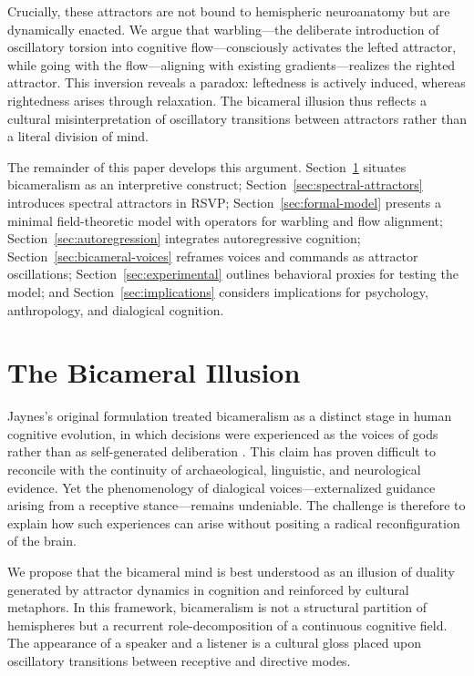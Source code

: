 \documentclass[a4paper,11pt]{article}
\begin{document}
Crucially, these attractors are not bound to hemispheric neuroanatomy but are dynamically enacted. We argue that warbling—the deliberate introduction of oscillatory torsion into cognitive flow—consciously activates the lefted attractor, while going with the flow—aligning with existing gradients—realizes the righted attractor. This inversion reveals a paradox: leftedness is actively induced, whereas rightedness arises through relaxation. The bicameral illusion thus reflects a cultural misinterpretation of oscillatory transitions between attractors rather than a literal division of mind.

The remainder of this paper develops this argument. Section~\ref{sec:bicameral-illusion} situates bicameralism as an interpretive construct; Section~\ref{sec:spectral-attractors} introduces spectral attractors in RSVP; Section~\ref{sec:formal-model} presents a minimal field-theoretic model with operators for warbling and flow alignment; Section~\ref{sec:autoregression} integrates autoregressive cognition; Section~\ref{sec:bicameral-voices} reframes voices and commands as attractor oscillations; Section~\ref{sec:experimental} outlines behavioral proxies for testing the model; and Section~\ref{sec:implications} considers implications for psychology, anthropology, and dialogical cognition.

\section{The Bicameral Illusion}
\label{sec:bicameral-illusion}

Jaynes’s original formulation treated bicameralism as a distinct stage in human cognitive evolution, in which decisions were experienced as the voices of gods rather than as self-generated deliberation \citep{jaynes1976origin}. This claim has proven difficult to reconcile with the continuity of archaeological, linguistic, and neurological evidence. Yet the phenomenology of dialogical voices—externalized guidance arising from a receptive stance—remains undeniable. The challenge is therefore to explain how such experiences can arise without positing a radical reconfiguration of the brain.

We propose that the bicameral mind is best understood as an illusion of duality generated by attractor dynamics in cognition and reinforced by cultural metaphors. In this framework, bicameralism is not a structural partition of hemispheres but a recurrent role-decomposition of a continuous cognitive field. The appearance of a speaker and a listener is a cultural gloss placed upon oscillatory transitions between receptive and directive modes.
\end{document}

